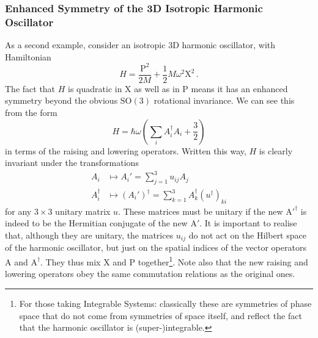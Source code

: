 \documentclass{article}
\theoremstyle{plain}\theoremheaderfont{\normalfont\itshape}\theorembodyfont{\rmfamily}\theoremseparator{.}\newtheorem*{rem}{Remark}\newtheorem*{ex}{Example}\newtheorem*{proof}{Proof}\newtheorem*{altp}{Alternative proof}
\theoremstyle{plain}\theoremheaderfont{\normalfont\bfseries}\theorembodyfont{\rmfamily}\theoremseparator{.}\newtheorem{thm}{Theorem}[section]\newtheorem{lem}[thm]{Lemma}\newtheorem{prop}[thm]{Proposition}\newtheorem*{cor}{Corollary}\newtheorem{defn}[thm]{Definition}\newtheorem{clm}[thm]{Claim}\newtheorem{clminproof}{Claim}
\theoremstyle{break}\theoremheaderfont{\normalfont\itshape}\theorembodyfont{\rmfamily}\theoremseparator{.\medskip}\newtheorem*{proofskip}{Proof}\newtheorem*{exs}{Examples}\newtheorem*{rems}{Remarks}
\theoremstyle{break}\theoremheaderfont{\normalfont\bfseries}\theorembodyfont{\rmfamily}\theoremseparator{.\medskip}\newtheorem{lemskip}[thm]{Lemma}\newtheorem{defnskip}[thm]{Definition}\newtheorem{propskip}[thm]{Proposition}\newtheorem{thmskip}[thm]{Theorem}
\numberwithin{equation}{section}
\newcommand{\vb}[1]{\bm{\mathrm{#1}}}
\newcommand{\SO}{\mathrm{SO}}
\begin{document}
    \subsubsection{Enhanced Symmetry of the 3D Isotropic Harmonic Oscillator}
    As a second example, consider an isotropic 3D harmonic oscillator, with Hamiltonian
    \begin{equation}
        H=\frac{\vb{P}^2}{2M}+\frac{1}{2}M\omega^2\vb{X}^2\,.
    \end{equation}
    The fact that \(H\) is quadratic in \(\vb{X}\) as well as in \(\vb{P}\) means it has an enhanced symmetry beyond the obvious \(\SO(3)\) rotational invariance. We can see this from the form
    \begin{equation}
        H=\hbar\omega\left(\sum_i A_i^\dagger A_i+\frac{3}{2}\right)
    \end{equation}
    in terms of the raising and lowering operators. Written this way, \(H\) is clearly invariant under the transformations
    \begin{align}\label{unitary_symmetry}
        A_i&\longmapsto A_i'=\sum_{j=1}^{3}u_{ij}A_j\\
        A_i^\dagger&\longmapsto (A_i')^\dagger=\sum_{k=1}^{3}A_k^\dagger (u^{\dagger})_{ki}
    \end{align}
    for any \(3\times 3\) unitary matrix \(u\). These matrices must be unitary if the new \(\vb{A}'^\dagger\) is indeed to be the Hermitian conjugate of the new \(\vb{A}'\). It is important to realise that, although they are unitary, the matrices \(u_{ij}\) do not act on the Hilbert space of the harmonic oscillator, but just on the spatial indices of the vector operators \(\vb{A}\) and \(\vb{A}^\dagger\). They thus mix \(\vb{X}\) and \(\vb{P}\) together\footnote{For those taking Integrable Systems: classically these are symmetries of phase space that do not come from symmetries of space itself, and reflect the fact that the harmonic oscillator is (super-)integrable.}. Note also that the new raising and lowering operators obey the same commutation relations as the original ones.
\end{document}

